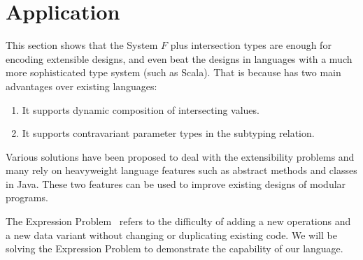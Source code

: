 \section{Application} \label{sec:application}


This section shows that the System $ F $ plus intersection types are enough for
encoding extensible designs, and even beat the designs in languages with a much
more sophisticated type system (such as Scala). That is because \name has two
main advantages over existing languages:

\begin{enumerate}
\item It supports dynamic composition of intersecting values.
\item It supports contravariant parameter types in the subtyping relation.
\end{enumerate}

Various solutions have been proposed to deal with the extensibility problems and
many rely on heavyweight language features such as abstract methods and classes
in Java. These two features can be used to improve existing designs of modular
programs.


\begin{comment}
\url{http://repository.cmu.edu/cgi/viewcontent.cgi?article=3018&context=compsci}
Church encoding allows modelling algebraic data types. 
\end{comment}


The Expression Problem~\cite{wadler1998expression} refers to the difficulty of
adding a new operations and a new data variant without changing or duplicating
existing code. We will be solving the Expression Problem to demonstrate the
capability of our language.



